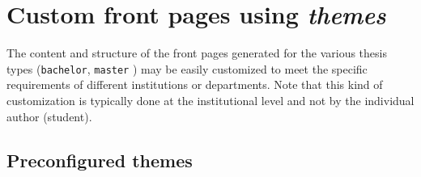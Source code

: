 \documentclass[language=english]{hgbarticle}
\begin{document}
\section{Custom front pages using \emph{themes}}
\label{sec:Themes}

The content and structure of the front pages generated for the various thesis types
(\texttt{bachelor}, \texttt{master} \etc) may be easily customized to meet the specific
requirements of different institutions or departments.
Note that this kind of customization is typically done at the institutional level and not
by the individual author (student).


\subsection{Preconfigured themes}
\end{document}
